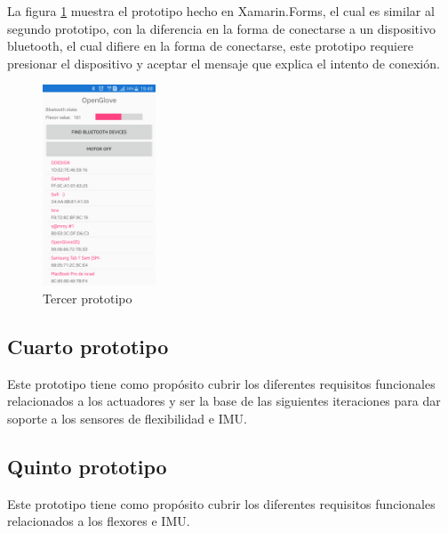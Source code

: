 La figura \ref{fig:prototype-03} muestra el prototipo hecho en Xamarin.Forms, el cual es similar al segundo prototipo, con la diferencia en la forma de conectarse a un dispositivo bluetooth, el cual difiere en la forma de conectarse, este prototipo requiere presionar el dispositivo y aceptar el mensaje que explica el intento de conexión.


\begin{figure}[H]
  \begin{center} 
   	\includegraphics[width=0.3\textwidth]{images/chapter03/03-prototype.png} 
    \caption{Tercer prototipo} 
    \label{fig:prototype-03}
  \end{center}
\end{figure}


\subsection{Cuarto prototipo}
\label{cuarto-prototipo}
Este prototipo tiene como propósito cubrir los diferentes requisitos funcionales relacionados a los actuadores y ser la base de las siguientes iteraciones para dar soporte a los sensores de flexibilidad e IMU.

\subsection{Quinto  prototipo}
\label{quinto-prototipo}
Este prototipo tiene como propósito cubrir los diferentes requisitos funcionales relacionados a los flexores e IMU.